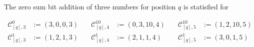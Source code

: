\begin{definition}
    
    The zero sum bit addition of three numbers for position $q$ is statisfied for

    \begin{equation}
        \begin{aligned}
                \mathcal{C}^{0}_{[q],3} &:= \left(3, 0, 0, 3\right) \quad & \mathcal{C}^{10}_{[q],4} &:= \left(0, 3, 10, 4\right) \quad & \mathcal{C}^{10}_{[q],5} &:= \left(1, 2, 10, 5\right)\\
                \mathcal{C}^{1}_{[q],3} &:= \left(1, 2, 1, 3\right) \quad & \mathcal{C}^{1}_{[q],4} &:= \left(2, 1, 1, 4\right) \quad & \mathcal{C}^{1}_{[q],5} &:= \left(3, 0, 1, 5\right)
            \label{eq:zerosumbitadditionproperties}
        \end{aligned}
    \end{equation}

\label{def:zerosumbitadditionproperties}
\end{definition}


